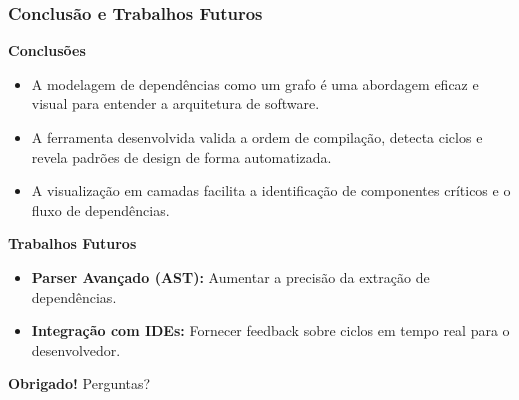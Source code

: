\documentclass{beamer}
\begin{document}
\begin{frame}
  \frametitle{Conclusão e Trabalhos Futuros}

  \textbf{Conclusões}
  \begin{itemize}
      \item A modelagem de dependências como um grafo é uma abordagem eficaz e visual para entender a arquitetura de software.
      \item A ferramenta desenvolvida valida a ordem de compilação, detecta ciclos e revela padrões de design de forma automatizada.
      \item A visualização em camadas facilita a identificação de componentes críticos e o fluxo de dependências.
  \end{itemize}
  \vspace{1cm}

  \textbf{Trabalhos Futuros}
  \begin{itemize}
      \item \textbf{Parser Avançado (AST):} Aumentar a precisão da extração de dependências.
      \item \textbf{Integração com IDEs:} Fornecer feedback sobre ciclos em tempo real para o desenvolvedor.
  \end{itemize}

\end{frame}

\begin{frame}
  \vfill
  \centering
  \huge{\textbf{Obrigado!}}
  \vspace{1cm}
  \Large{Perguntas?}
  \vfill
\end{frame}
\end{document}
